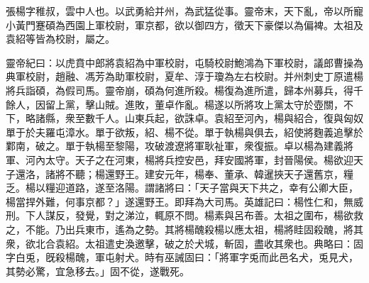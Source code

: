 
\begin{pinyinscope}
張楊字稚叔，雲中人也。以武勇給并州，為武猛從事。靈帝末，天下亂，帝以所寵小黃門蹇碩為西園上軍校尉，軍京都，欲以御四方，徵天下豪傑以為偏裨。太祖及袁紹等皆為校尉，屬之。

靈帝紀曰：以虎賁中郎將袁紹為中軍校尉，屯騎校尉鮑鴻為下軍校尉，議郎曹操為典軍校尉，趙融、馮芳為助軍校尉，夏牟、淳于瓊為左右校尉。并州刺史丁原遣楊將兵詣碩，為假司馬。靈帝崩，碩為何進所殺。楊復為進所遣，歸本州募兵，得千餘人，因留上黨，擊山賊。進敗，董卓作亂。楊遂以所將攻上黨太守於壺關，不下，略諸縣，衆至數千人。山東兵起，欲誅卓。袁紹至河內，楊與紹合，復與匈奴單于於夫羅屯漳水。單于欲叛，紹、楊不從。單于執楊與俱去，紹使將麴義追擊於鄴南，破之。單于執楊至黎陽，攻破渡遼將軍耿祉軍，衆復振。卓以楊為建義將軍、河內太守。天子之在河東，楊將兵控安邑，拜安國將軍，封晉陽侯。楊欲迎天子還洛，諸將不聽；楊還野王。建安元年，楊奉、董承、韓暹挾天子還舊京，糧乏。楊以糧迎道路，遂至洛陽。謂諸將曰：「天子當與天下共之，幸有公卿大臣，楊當捍外難，何事京都？」遂還野王。即拜為大司馬。英雄記曰：楊性仁和，無威刑。下人謀反，發覺，對之涕泣，輒原不問。楊素與呂布善。太祖之圍布，楊欲救之，不能。乃出兵東市，遙為之勢。其將楊醜殺楊以應太祖，楊將眭固殺醜，將其衆，欲北合袁紹。太祖遣史渙邀擊，破之於犬城，斬固，盡收其衆也。典略曰：固字白兎，旣殺楊醜，軍屯射犬。時有巫誡固曰：「將軍字兎而此邑名犬，兎見犬，其勢必驚，宜急移去。」固不從，遂戰死。


\end{pinyinscope}